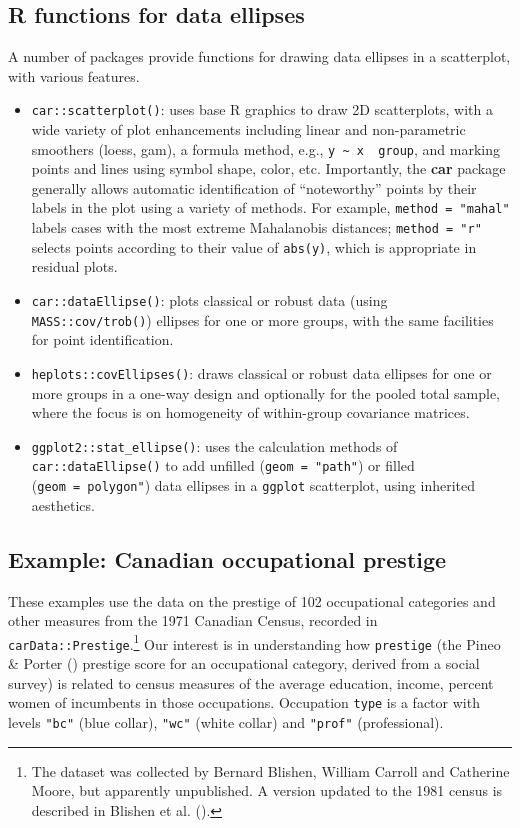 \documentclass[
  letterpaper,
  10pt,
  krantz2]{krantz}
\providecommand{\tightlist}{%
  \setlength{\itemsep}{0pt}\setlength{\parskip}{0pt}}\usepackage{longtable,booktabs,array}
\begin{document}
\subsection{R functions for data
ellipses}\label{r-functions-for-data-ellipses}

A number of packages provide functions for drawing data ellipses in a
scatterplot, with various features.

\begin{itemize}
\tightlist
\item
  \texttt{car::scatterplot()}: uses base R graphics to draw 2D
  scatterplots, with a wide variety of plot enhancements including
  linear and non-parametric smoothers (loess, gam), a formula method,
  e.g., \texttt{y\ \textasciitilde{}\ x\ \textbar{}\ group}, and marking
  points and lines using symbol shape, color, etc. Importantly, the
  \textbf{car} package generally allows automatic identification of
  ``noteworthy'' points by their labels in the plot using a variety of
  methods. For example, \texttt{method\ =\ "mahal"} labels cases with
  the most extreme Mahalanobis distances; \texttt{method\ =\ "r"}
  selects points according to their value of \texttt{abs(y)}, which is
  appropriate in residual plots.
\item
  \texttt{car::dataEllipse()}: plots classical or robust data (using
  \texttt{MASS::cov/trob()}) ellipses for one or more groups, with the
  same facilities for point identification.
\item
  \texttt{heplots::covEllipses()}: draws classical or robust data
  ellipses for one or more groups in a one-way design and optionally for
  the pooled total sample, where the focus is on homogeneity of
  within-group covariance matrices.
\item
  \texttt{ggplot2::stat\_ellipse()}: uses the calculation methods of
  \texttt{car::dataEllipse()} to add unfilled (\texttt{geom\ =\ "path"})
  or filled (\texttt{geom\ =\ polygon"}) data ellipses in a
  \texttt{ggplot} scatterplot, using inherited aesthetics.
\end{itemize}

\subsection{Example: Canadian occupational prestige}\label{sec-prestige}

These examples use the data on the prestige of 102 occupational
categories and other measures from the 1971 Canadian Census, recorded in
\texttt{carData::Prestige}.\footnote{The dataset was collected by
  Bernard Blishen, William Carroll and Catherine Moore, but apparently
  unpublished. A version updated to the 1981 census is described in
  Blishen et al. ().} Our interest
is in understanding how \texttt{prestige} (the Pineo \& Porter
() prestige score for an
occupational category, derived from a social survey) is related to
census measures of the average education, income, percent women of
incumbents in those occupations. Occupation \texttt{type} is a factor
with levels \texttt{"bc"} (blue collar), \texttt{"wc"} (white collar)
and \texttt{"prof"} (professional).
\end{document}
